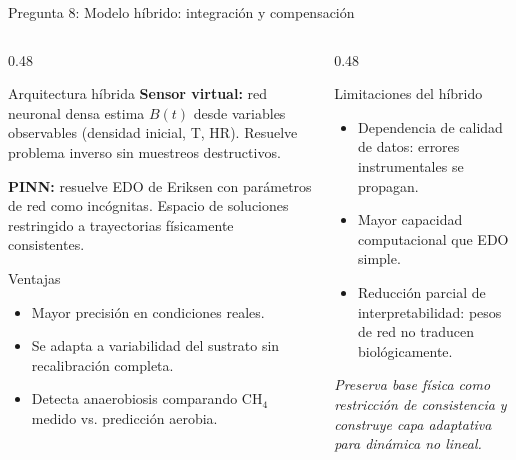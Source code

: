 \documentclass[aspectratio=169, 11pt]{beamer}
\begin{document}
\begin{frame}{Pregunta 8: Modelo híbrido: integración y compensación}
\begin{columns}[T]
\begin{column}{0.48\textwidth}
\begin{block}{Arquitectura híbrida}
\footnotesize
\textbf{Sensor virtual:} red neuronal densa estima $B(t)$ desde variables observables (densidad inicial, T, HR). Resuelve problema inverso sin muestreos destructivos.

\textbf{PINN:} resuelve EDO de Eriksen con parámetros de red como incógnitas. Espacio de soluciones restringido a trayectorias físicamente consistentes.
\end{block}
\begin{exampleblock}{Ventajas}
\footnotesize
\begin{itemize}
    \item Mayor precisión en condiciones reales.
    \item Se adapta a variabilidad del sustrato sin recalibración completa.
    \item Detecta anaerobiosis comparando CH$_4$ medido vs. predicción aerobia.
\end{itemize}
\end{exampleblock}
\end{column}
\begin{column}{0.48\textwidth}
\begin{alertblock}{Limitaciones del híbrido}
\footnotesize
\begin{itemize}
    \item Dependencia de calidad de datos: errores instrumentales se propagan.
    \item Mayor capacidad computacional que EDO simple.
    \item Reducción parcial de interpretabilidad: pesos de red no traducen biológicamente.
\end{itemize}
\end{alertblock}
\vspace{0.2cm}
\centering
\footnotesize\textit{Preserva base física como restricción de consistencia y construye capa adaptativa para dinámica no lineal.}
\end{column}
\end{columns}
\end{frame}
\end{document}
